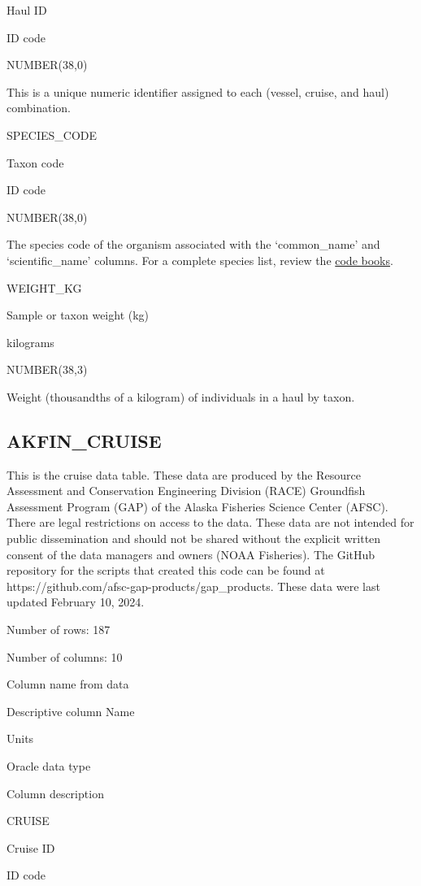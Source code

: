 \documentclass[
  letterpaper,
  oneside,
  open=any]{scrbook}
\begin{document}
Haul ID

ID code

NUMBER(38,0)

This is a unique numeric identifier assigned to each (vessel, cruise,
and haul) combination.

SPECIES\_CODE

Taxon code

ID code

NUMBER(38,0)

The species code of the organism associated with the `common\_name' and
`scientific\_name' columns. For a complete species list, review the
\href{https://www.fisheries.noaa.gov/resource/document/groundfish-survey-species-code-manual-and-data-codes-manual}{code
books}.

WEIGHT\_KG

Sample or taxon weight (kg)

kilograms

NUMBER(38,3)

Weight (thousandths of a kilogram) of individuals in a haul by taxon.

\hypertarget{akfin_cruise}{%
\subsection{AKFIN\_CRUISE}\label{akfin_cruise}}

This is the cruise data table. These data are produced by the Resource
Assessment and Conservation Engineering Division (RACE) Groundfish
Assessment Program (GAP) of the Alaska Fisheries Science Center (AFSC).
There are legal restrictions on access to the data. These data are not
intended for public dissemination and should not be shared without the
explicit written consent of the data managers and owners (NOAA
Fisheries). The GitHub repository for the scripts that created this code
can be found at https://github.com/afsc-gap-products/gap\_products.
These data were last updated February 10, 2024.

Number of rows: 187

Number of columns: 10

Column name from data

Descriptive column Name

Units

Oracle data type

Column description

CRUISE

Cruise ID

ID code
\end{document}
